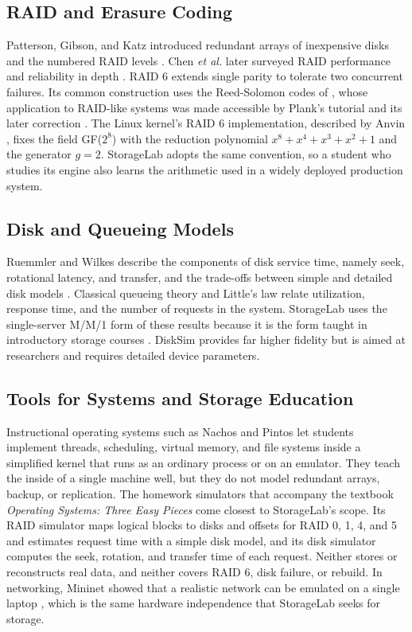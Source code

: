\documentclass{ieeeaccess}
\begin{document}
\subsection{RAID and Erasure Coding}
Patterson, Gibson, and Katz introduced redundant arrays of inexpensive disks and the numbered RAID levels \cite{patterson1988raid}. Chen \emph{et al.} later surveyed RAID performance and reliability in depth \cite{chen1994raid}. RAID 6 extends single parity to tolerate two concurrent failures. Its common construction uses the Reed-Solomon codes of \cite{reed1960polynomial}, whose application to RAID-like systems was made accessible by Plank's tutorial \cite{plank1997tutorial} and its later correction \cite{plank2005correction}. The Linux kernel's RAID 6 implementation, described by Anvin \cite{anvin2004raid6}, fixes the field GF($2^8$) with the reduction polynomial $x^8+x^4+x^3+x^2+1$ and the generator $g=2$. StorageLab adopts the same convention, so a student who studies its engine also learns the arithmetic used in a widely deployed production system.

\subsection{Disk and Queueing Models}
Ruemmler and Wilkes describe the components of disk service time, namely seek, rotational latency, and transfer, and the trade-offs between simple and detailed disk models \cite{ruemmler1994disk}. Classical queueing theory \cite{kleinrock1975queueing} and Little's law \cite{little1961proof} relate utilization, response time, and the number of requests in the system. StorageLab uses the single-server M/M/1 form of these results because it is the form taught in introductory storage courses \cite{emc2012ism}. DiskSim \cite{bucy2008disksim} provides far higher fidelity but is aimed at researchers and requires detailed device parameters.

\subsection{Tools for Systems and Storage Education}
Instructional operating systems such as Nachos \cite{christopher1993nachos} and Pintos \cite{pfaff2009pintos} let students implement threads, scheduling, virtual memory, and file systems inside a simplified kernel that runs as an ordinary process or on an emulator. They teach the inside of a single machine well, but they do not model redundant arrays, backup, or replication. The homework simulators that accompany the textbook \emph{Operating Systems: Three Easy Pieces} \cite{ostep2023, ostephw} come closest to StorageLab's scope. Its RAID simulator maps logical blocks to disks and offsets for RAID 0, 1, 4, and 5 and estimates request time with a simple disk model, and its disk simulator computes the seek, rotation, and transfer time of each request. Neither stores or reconstructs real data, and neither covers RAID 6, disk failure, or rebuild. In networking, Mininet showed that a realistic network can be emulated on a single laptop \cite{lantz2010mininet}, which is the same hardware independence that StorageLab seeks for storage.
\end{document}
